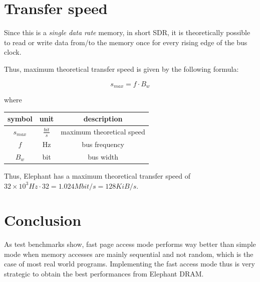 \documentclass[a4paper,12pt]{article}
\newcommand{\memoryname}{Elephant}
\begin{document}

%

\section{Transfer speed}
Since this is a \emph{single data rate} memory, in short SDR, it is theoretically possible to read or write data from/to the memory once for every rising edge of the bus clock.

Thus, maximum theoretical transfer speed is given by the following formula:

$$ s_{max} =  f \cdot B_w $$

where

\bgroup
\def\arraystretch{1.5}
\begin{table}[H]
\center
\begin{tabular}{| c | c | c |}\hline
\textbf{symbol} & \textbf{unit} & \textbf{description} \\ \hline
$ s_{max} $ & $ \frac{bit}{s} $ & maximum theoretical speed \\ \hline
$ f $ & Hz & bus frequency \\ \hline
$ B_{w} $ & bit & bus width \\ \hline
\end{tabular}
\end{table}
\egroup

Thus, \memoryname{} has a maximum theoretical transfer speed of $32 \times 10^{3} Hz \cdot 32 = 1.024 Mbit/s = 128 KiB/s $.

\section{Conclusion}
As test benchmarks show, fast page access mode performs way better than simple mode when memory accesses are mainly sequential and not random, which is the case of most real world programs.
Implementing the fast access mode thus is very strategic to obtain the best performances from \memoryname{} DRAM.
\end{document}
